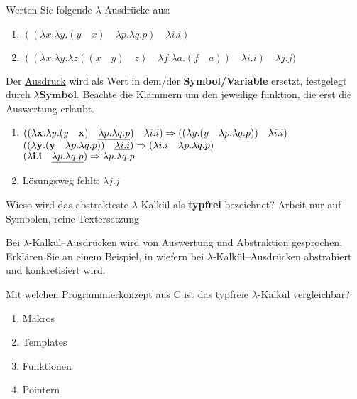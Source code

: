 \begin{card}
	Werten Sie folgende $\lambda$-Ausdrücke aus:
	\begin{enumerate}
	\item $((\lambda x.\lambda y.(y \quad x) \quad \lambda p.\lambda q.p) \quad \lambda i.i)$
	\item $((\lambda x.\lambda y.\lambda z((x \quad y) \quad z) \quad \lambda f.\lambda a.(f \quad a)) \quad \lambda i.i) \quad\lambda j.j)$
	\end{enumerate}
	\hr
	Der \underline{Ausdruck} wird als Wert in dem/der \textbf{Symbol/Variable} ersetzt, festgelegt durch $\lambda\mathbf{Symbol}$. Beachte die Klammern um den jeweilige funktion, die erst die Auswertung erlaubt.
	\begin{enumerate}
	\item
	$((\lambda \mathbf{x}.\lambda y.(y \quad \mathbf{x}) \quad \uline{\lambda p.\lambda q.p}) \quad \lambda i.i) 
	\Rightarrow 
	((\lambda y.(y \quad \lambda p.\lambda q.p)) \quad \lambda i.i)$\\
	
	$((\lambda \mathbf{y}.(\mathbf{y} \quad \lambda p.\lambda q.p)) \quad \uline{\lambda i.i})
	\Rightarrow
	(\lambda i.i \quad \lambda p.\lambda q.p)$\\
	
	$(\lambda \mathbf{i}.\mathbf{i} \quad \uline{\lambda p.\lambda q.p})
	\Rightarrow
	\lambda p.\lambda q.p$
	\item Lösungsweg fehlt: $\lambda j.j$
	\end{enumerate}	
\end{card}


\begin{card}
	Wieso wird das abstrakteste $\lambda$-Kalkül als \textbf{typfrei} bezeichnet?
	\hr
	Arbeit nur auf Symbolen, reine Textersetzung
\end{card}

\begin{card}
	Bei $\lambda$-Kalkül–Ausdrücken wird von Auswertung und Abstraktion gesprochen. Erklären Sie an einem Beispiel, in wiefern bei $\lambda$-Kalkül–Ausdrücken abstrahiert und	konkretisiert wird.
	\hr
	
\end{card}

\begin{card}
	Mit welchen Programmierkonzept aus C ist das typfreie $\lambda$-Kalkül vergleichbar? 
	\begin{enumerate}
	\item Makros
	\item Templates
	\item Funktionen
	\item Pointern
	\end{enumerate}
	\hr
\end{card}

